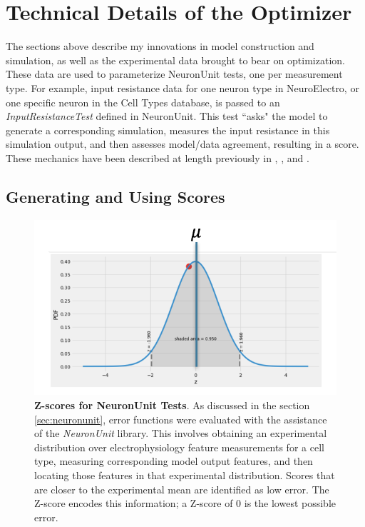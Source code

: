 \section{Technical Details of the Optimizer}
\label{sec:tech-details}
The sections above describe my innovations in model construction and simulation, as well as the experimental data brought to bear on optimization. These data are used to parameterize NeuronUnit tests, one per measurement type.
For example, input resistance data for one neuron type in NeuroElectro, or one specific neuron in the Cell Types database, is passed to an \textit{InputResistanceTest} defined in NeuronUnit.
This test ``asks" the model to generate a corresponding simulation, measures the input resistance in this simulation output, and then assesses model/data agreement, resulting in a score.
These mechanics have been described at length previously in \cite{omar2014collaborative}, \cite{gerkin_neuronunit}, and \cite{birgiolas2019towards}.

\subsection{Generating and Using Scores}
\begin{figure}
\begin{center}
    \includegraphics{figures/normal_distribution}
    \caption[Z-scores for NeuronUnit Tests]{\textbf{Z-scores for NeuronUnit Tests}. As discussed in the section \ref{sec:neuronunit}, error functions were evaluated with the assistance of the \emph{NeuronUnit} library.
    This involves obtaining an experimental distribution over electrophysiology feature measurements for a cell type, measuring corresponding model output features, and then locating those features in that experimental distribution. 
    Scores that are closer to the experimental mean are identified as low error.
	The Z-score encodes this information; a Z-score of 0 is the lowest possible error.}
	\label{fig:normal-dist}
\end{center}
\end{figure}


